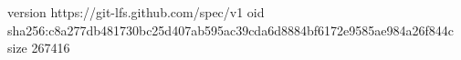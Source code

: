version https://git-lfs.github.com/spec/v1
oid sha256:c8a277db481730bc25d407ab595ac39cda6d8884bf6172e9585ae984a26f844c
size 267416
